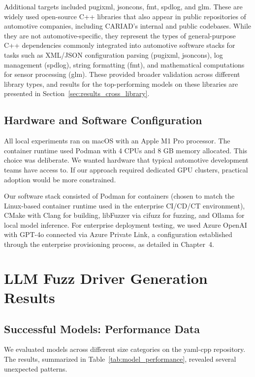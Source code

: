Additional targets included pugixml, jsoncons, fmt, spdlog, and glm. These are widely used open-source C++ libraries that also appear in public repositories of automotive companies, including CARIAD's internal and public codebases. While they are not automotive-specific, they represent the types of general-purpose C++ dependencies commonly integrated into automotive software stacks for tasks such as XML/JSON configuration parsing (pugixml, jsoncons), log management (spdlog), string formatting (fmt), and mathematical computations for sensor processing (glm). These provided broader validation across different library types, and results for the top-performing models on these libraries are presented in Section~\ref{sec:results_cross_library}.


\subsection{Hardware and Software Configuration}
\label{sec:exp_hardware}

All local experiments ran on macOS with an Apple M1 Pro processor. The container runtime used Podman with 4 CPUs and 8 GB memory allocated. This choice was deliberate. We wanted hardware that typical automotive development teams have access to. If our approach required dedicated GPU clusters, practical adoption would be more constrained.

Our software stack consisted of Podman for containers (chosen to match the Linux-based container runtime used in the enterprise CI/CD/CT environment), CMake with Clang for building, libFuzzer via cifuzz for fuzzing, and Ollama for local model inference. For enterprise deployment testing, we used Azure OpenAI with GPT-4o connected via Azure Private Link, a configuration established through the enterprise provisioning process, as detailed in Chapter~4.


\section{LLM Fuzz Driver Generation Results}
\label{sec:results_generation}

\subsection{Successful Models: Performance Data}
\label{sec:results_successful}

We evaluated models across different size categories on the yaml-cpp repository. The results, summarized in Table~\ref{tab:model_performance}, revealed several unexpected patterns.

